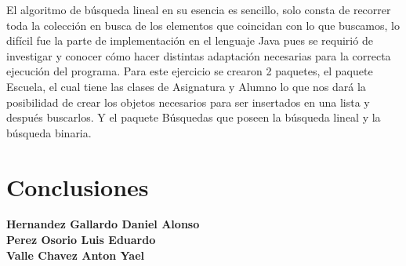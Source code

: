 \documentclass{report}
\begin{document}
El algoritmo de búsqueda lineal en su esencia es sencillo, solo consta de recorrer toda la colección en busca de los elementos que coincidan con lo que buscamos, lo difícil fue la parte de implementación en el lenguaje Java pues se requirió de investigar y conocer cómo hacer distintas adaptación necesarias para la correcta ejecución del programa.
Para este ejercicio se crearon 2 paquetes, el paquete Escuela, el cual tiene las clases de Asignatura y Alumno lo que nos dará la posibilidad de crear los objetos necesarios para ser insertados en una lista y después buscarlos.
Y el paquete Búsquedas que poseen la búsqueda lineal y la búsqueda binaria.





\chapter{Conclusiones}
\textbf{Hernandez Gallardo Daniel Alonso} \\
\newpage
\textbf{Perez Osorio Luis Eduardo} \\

\newpage
\textbf{Valle Chavez Anton Yael} \\
\newpage
\nocite{*}
  \newpage

\end{document}
